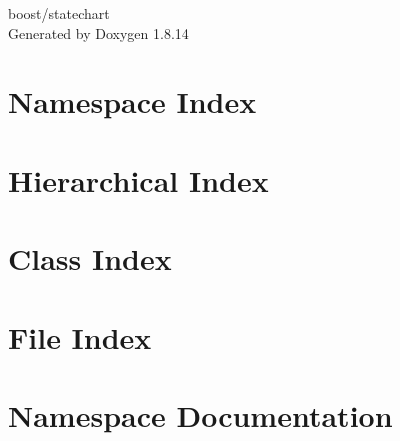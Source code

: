 \documentclass[twoside]{book}
\newcommand{\+}{\discretionary{\mbox{\scriptsize$\hookleftarrow$}}{}{}}
\newcommand{\clearemptydoublepage}{%
  \newpage{\pagestyle{empty}\cleardoublepage}%
}
\begin{document}
\hypersetup{pageanchor=false,
             bookmarksnumbered=true,
             pdfencoding=unicode
            }
\begin{titlepage}
\vspace*{7cm}
\begin{center}%
{\Large boost/statechart }\\
\vspace*{1cm}
{\large Generated by Doxygen 1.8.14}\\
\end{center}
\end{titlepage}
\clearemptydoublepage
{}
\tableofcontents
\clearemptydoublepage
{}
\hypersetup{pageanchor=true}

\chapter{Namespace Index}

\chapter{Hierarchical Index}

\chapter{Class Index}

\chapter{File Index}

\chapter{Namespace Documentation}



\end{document}
